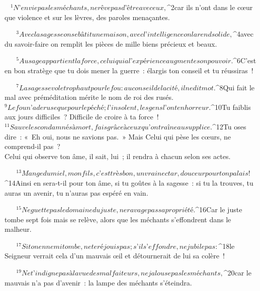          
      \bchapter{}
${}^{1}N’envie pas les méchants,
        ne rêve pas d’être avec eux,
${}^{2}car ils n’ont dans le cœur que violence
        et sur les lèvres, des paroles menaçantes.
        
           
         
${}^{3}Avec la sagesse on se bâtit une maison,
        avec l’intelligence on la rend solide,
${}^{4}avec du savoir-faire on remplit les pièces
        de mille biens précieux et beaux.
        
           
         
${}^{5}Au sage appartient la force,
        celui qui a l’expérience augmente son pouvoir.
${}^{6}C’est en bon stratège que tu dois mener la guerre :
        élargis ton conseil et tu réussiras !
        
           
         
${}^{7}La sagesse vole trop haut pour le fou :
        au conseil de la cité, il ne dit mot.
${}^{8}Qui fait le mal avec préméditation
        mérite le nom de roi des rusés.
${}^{9}Le fou n’a de ruse que pour le péché ;
        l’insolent, les gens l’ont en horreur.
        
           
         
${}^{10}Tu faiblis aux jours difficiles ?
        Difficile de croire à ta force !
${}^{11}Sauve les condamnés à mort,
        fais grâce à ceux qu’on traîne au supplice.
${}^{12}Tu oses dire : « Eh oui, nous ne savions pas. »
        Mais Celui qui pèse les cœurs, ne comprend-il pas ?
        \\Celui qui observe ton âme, il sait, lui ;
        il rendra à chacun selon ses actes.
        
           
         
${}^{13}Mange du miel, mon fils, c’est très bon,
        un vrai nectar, douceur pour ton palais !
${}^{14}Ainsi en sera-t-il pour ton âme, si tu goûtes à la sagesse :
        si tu la trouves, tu auras un avenir,
        tu n’auras pas espéré en vain.
        
           
         
${}^{15}Ne guette pas le domaine du juste,
        ne ravage pas sa propriété.
${}^{16}Car le juste tombe sept fois mais se relève,
        alors que les méchants s’effondrent dans le malheur.
        
           
         
${}^{17}Si ton ennemi tombe, ne te réjouis pas ;
        s’il s’effondre, ne jubile pas :
${}^{18}le Seigneur verrait cela d’un mauvais œil
        et détournerait de lui sa colère !
        
           
         
${}^{19}Ne t’indigne pas à la vue des malfaiteurs,
        ne jalouse pas les méchants,
${}^{20}car le mauvais n’a pas d’avenir :
        la lampe des méchants s’éteindra.
        
